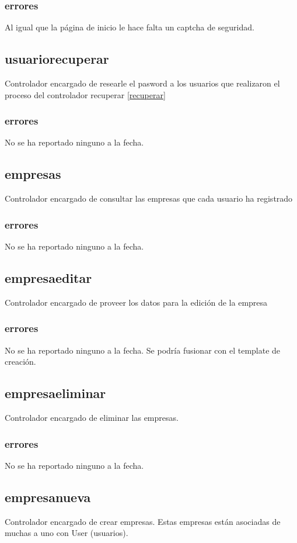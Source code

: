 \documentclass[10pt,a4paper]{book}
\begin{document}
	\subsubsection{errores}
	Al igual que la página de inicio le hace falta un captcha de seguridad.
	
	\subsection{usuariorecuperar}
	Controlador encargado de researle el pasword a los usuarios que realizaron el proceso del controlador  recuperar \ref{recuperar}
	\subsubsection{errores}
	No se ha reportado ninguno a la fecha.
	
	\subsection{empresas}
	Controlador encargado de consultar las empresas que cada usuario ha registrado
	\subsubsection{errores}
	No se ha reportado ninguno a la fecha.
	
	\subsection{empresaeditar}
	Controlador encargado de proveer los datos para la edición de la empresa
	\subsubsection{errores}
	No se ha reportado ninguno a la fecha. Se podría fusionar con el template de creación.
	
	\subsection{empresaeliminar}
	Controlador encargado de eliminar las empresas.
	\subsubsection{errores}
	No se ha reportado ninguno a la fecha.
	
	\subsection{empresanueva}
	Controlador encargado de crear empresas. Estas empresas están asociadas de muchas a uno con User (usuarios).
\end{document}
